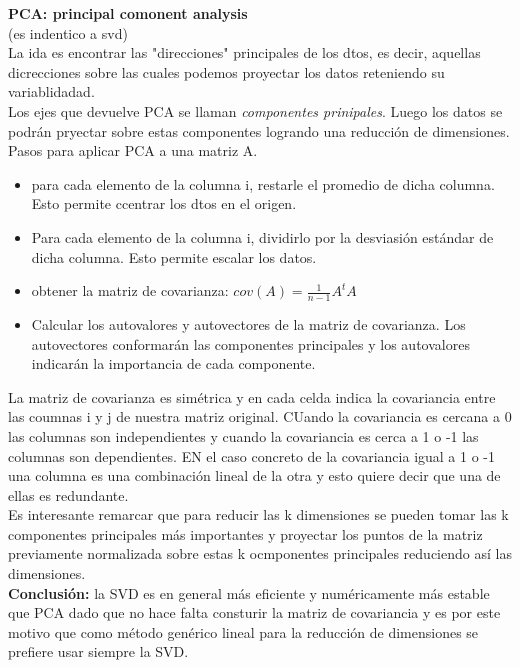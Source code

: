 \documentclass[titlepage,a4paper]{article}
\begin{document}
\textbf{PCA: principal comonent analysis}\\
(es indentico a svd)\\

La ida es encontrar las "direcciones" principales de los dtos, es decir, aquellas dicrecciones sobre las cuales podemos proyectar los datos reteniendo su variablidadad. \\

Los ejes que devuelve PCA se llaman \textit{componentes prinipales}. Luego los datos se podrán pryectar sobre estas componentes logrando una reducción de dimensiones. Pasos para aplicar PCA a una matriz A.
\begin{itemize}
\item  para cada elemento de la columna i, restarle el promedio de dicha columna. Esto permite ccentrar los dtos en el origen. 
\item Para cada elemento de la columna i, dividirlo por la desviasión estándar de dicha columna. Esto permite escalar los datos. 
\item obtener la matriz de covarianza: $cov(A) = \frac{1}{n-1} A^t A$ 
\item Calcular los autovalores y autovectores de la matriz de covarianza. Los autovectores conformarán las componentes principales y los autovalores indicarán la importancia de cada componente. 
\end{itemize}

La matriz de covarianza es simétrica y en cada celda indica la covariancia entre las coumnas i y j de nuestra matriz original. CUando la covariancia es cercana a 0 las columnas son independientes y cuando la covariancia es cerca a 1 o -1 las columnas son dependientes. EN el caso concreto de la covariancia igual a 1 o -1 una columna es una combinación lineal de la otra y esto quiere decir que una de ellas es redundante. \\

Es interesante remarcar que para reducir las k dimensiones se pueden tomar las k componentes principales más importantes y proyectar los puntos de la matriz previamente normalizada sobre estas k ocmponentes principales reduciendo así las dimensiones. \\

\textbf{Conclusión:} la SVD es en general más eficiente y numéricamente más estable que PCA dado que no hace falta consturir la matriz de covariancia y es por este motivo que como método genérico lineal para la reducción de dimensiones se prefiere usar siempre la SVD.\\
\end{document}
